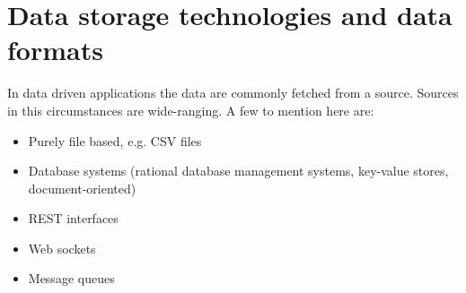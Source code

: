 \section{Data storage technologies and data formats\label{sec:storage}}

In data driven applications the data are commonly fetched from a source. Sources in this circumstances are wide-ranging. A few to mention here are:
\begin{itemize}
  \item Purely file based, e.g. CSV files
  \item Database systems (rational database management systems, key-value stores, document-oriented)
  \item REST interfaces
  \item Web sockets
  \item Message queues\\
\end{itemize}

